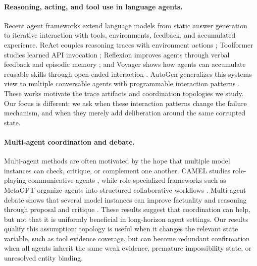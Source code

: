 \documentclass{article}
\theoremstyle{plain}
\theoremstyle{definition}
\theoremstyle{remark}
\begin{document}
\paragraph{Reasoning, acting, and tool use in language agents.}
Recent agent frameworks extend language models from static answer generation to iterative interaction with tools, environments, feedback, and accumulated experience. ReAct couples reasoning traces with environment actions \cite{react}; Toolformer studies learned API invocation \cite{toolformer}; Reflexion improves agents through verbal feedback and episodic memory \cite{reflexion}; and Voyager shows how agents can accumulate reusable skills through open-ended interaction \cite{voyager}. AutoGen generalizes this systems view to multiple conversable agents with programmable interaction patterns \cite{autogen}. These works motivate the trace artifacts and coordination topologies we study. Our focus is different: we ask when these interaction patterns change the failure mechanism, and when they merely add deliberation around the same corrupted state.

\paragraph{Multi-agent coordination and debate.}
Multi-agent methods are often motivated by the hope that multiple model instances can check, critique, or complement one another. CAMEL studies role-playing communicative agents \cite{camel}, while role-specialized frameworks such as MetaGPT organize agents into structured collaborative workflows \cite{metagpt}. Multi-agent debate shows that several model instances can improve factuality and reasoning through proposal and critique \cite{multiagentdebate}. These results suggest that coordination can help, but not that it is uniformly beneficial in long-horizon agent settings. Our results qualify this assumption: topology is useful when it changes the relevant state variable, such as tool evidence coverage, but can become redundant confirmation when all agents inherit the same weak evidence, premature impossibility state, or unresolved entity binding.
\end{document}
